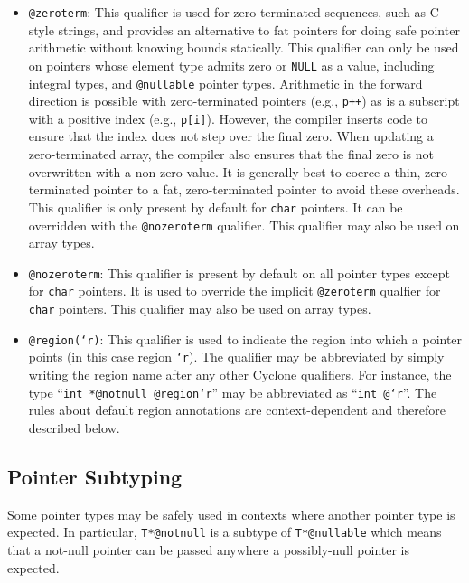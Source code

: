 \begin{itemize}
\item \texttt{@zeroterm}:  This qualifier is used for zero-terminated
sequences, such as C-style strings, and provides an alternative to
fat pointers for doing safe pointer arithmetic without knowing 
bounds statically.  This qualifier can only be used on pointers whose
element type admits zero or \texttt{NULL} as a value, including
integral types, and \texttt{@nullable} pointer types.  Arithmetic
in the forward direction is possible with zero-terminated pointers
(e.g., \texttt{p++}) as is a subscript with a positive index
(e.g., \texttt{p[i]}).  However, the compiler inserts code to ensure
that the index does not step over the final zero.  When updating
a zero-terminated array, the compiler also ensures that the final
zero is not overwritten with a non-zero value.  It is generally best
to coerce a thin, zero-terminated pointer to a fat, zero-terminated
pointer to avoid these overheads.  This qualifier is 
only present by default for \texttt{char} pointers.  It can be
overridden with the \texttt{@nozeroterm} qualifier.  This qualifier
may also be used on array types.

\item \texttt{@nozeroterm}:  
This qualifier is present by default
on all pointer types except for \texttt{char} pointers.  It is
used to override the implicit \texttt{@zeroterm} qualfier for
\texttt{char} pointers.  This qualifier may also be used on array types.

\item \texttt{@region(`r)}:  This qualifier is used to indicate the
region into which a pointer points (in this case region \texttt{`r}).
The qualifier may be abbreviated by simply writing the region name
after any other Cyclone qualifiers.  
For instance, the type ``\texttt{int *@notnull @region{`r}}''
may be abbreviated as ``\texttt{int @`r}''.  The rules about default
region annotations are context-dependent and therefore described below.
\end{itemize}

\subsection{Pointer Subtyping}

Some pointer types may be safely used in contexts where another
pointer type is expected.  In particular, \texttt{T*@notnull} is a
subtype of \texttt{T*@nullable} which means that a not-null pointer
can be passed anywhere a possibly-null pointer is expected.

